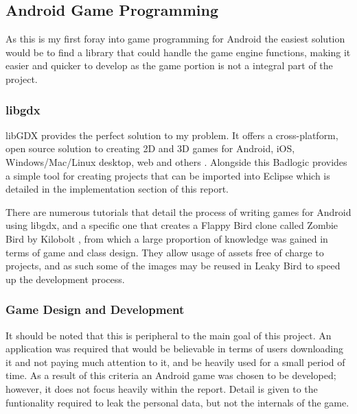 \subsection{Android Game Programming}
As this is my first foray into game programming for Android the easiest solution would be to find a library that could handle the game engine functions, making it easier and quicker to develop as the game portion is not a integral part of the project.

\subsubsection{libgdx}
libGDX provides the perfect solution to my problem. It offers a cross-platform, open source solution to creating 2D and 3D games for Android, iOS, Windows/Mac/Linux desktop, web and others \cite{research:badlogix}. Alongside this Badlogic provides a simple tool for creating projects that can be imported into Eclipse which is detailed in the implementation section of this report.

There are numerous tutorials that detail the process of writing games for Android using libgdx, and a specific one that creates a Flappy Bird \cite{research:flappy_guardian} clone called Zombie Bird by Kilobolt \cite{research:kilo_tut}, from which a large proportion of knowledge was gained in terms of game and class design. They allow usage of assets free of charge to projects, and as such some of the images may be reused in Leaky Bird to speed up the development process.

\subsubsection{Game Design and Development}

It should be noted that this is peripheral to the main goal of this project. An application was required that would be believable in terms of users downloading it and not paying much attention to it, and be heavily used for a small period of time. As a result of this criteria an Android game was chosen to be developed; however, it does not focus heavily within the report. Detail is given to the funtionality required to leak the personal data, but not the internals of the game.